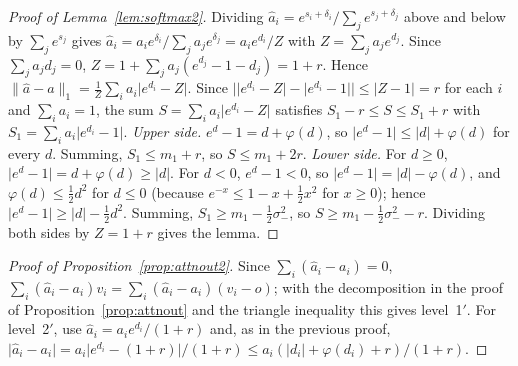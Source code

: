\documentclass[10pt]{article}
\theoremstyle{plain}
\theoremstyle{definition}
\theoremstyle{remark}
\begin{document}
\begin{proof}[Proof of Lemma~\ref{lem:softmax2}]
Dividing $\hat a_i=e^{s_i+\delta_i}/\sum_je^{s_j+\delta_j}$ above and below by $\sum_je^{s_j}$ gives $\hat a_i=a_ie^{\delta_i}/\sum_ja_je^{\delta_j}=a_ie^{d_i}/Z$ with $Z=\sum_ja_je^{d_j}$. Since $\sum_ja_jd_j=0$, $Z=1+\sum_ja_j(e^{d_j}-1-d_j)=1+r$. Hence $\lVert\hat a-a\rVert_1=\frac1Z\sum_ia_i\lvert e^{d_i}-Z\rvert$. Since $\bigl\lvert\lvert e^{d_i}-Z\rvert-\lvert e^{d_i}-1\rvert\bigr\rvert\le\lvert Z-1\rvert=r$ for each $i$ and $\sum_ia_i=1$, the sum $S=\sum_ia_i\lvert e^{d_i}-Z\rvert$ satisfies $S_1-r\le S\le S_1+r$ with $S_1=\sum_ia_i\lvert e^{d_i}-1\rvert$.
\emph{Upper side.} $e^d-1=d+\varphi(d)$, so $\lvert e^d-1\rvert\le\lvert d\rvert+\varphi(d)$ for every $d$. Summing, $S_1\le m_1+r$, so $S\le m_1+2r$.
\emph{Lower side.} For $d\ge0$, $\lvert e^d-1\rvert=d+\varphi(d)\ge\lvert d\rvert$. For $d<0$, $e^d-1<0$, so $\lvert e^d-1\rvert=\lvert d\rvert-\varphi(d)$, and $\varphi(d)\le\frac12d^2$ for $d\le0$ (because $e^{-x}\le1-x+\frac12x^2$ for $x\ge0$); hence $\lvert e^d-1\rvert\ge\lvert d\rvert-\frac12d^2$. Summing, $S_1\ge m_1-\frac12\sigma_-^2$, so $S\ge m_1-\frac12\sigma_-^2-r$.
Dividing both sides by $Z=1+r$ gives the lemma.
\end{proof}

\begin{proof}[Proof of Proposition~\ref{prop:attnout2}]
Since $\sum_i(\hat a_i-a_i)=0$, $\sum_i(\hat a_i-a_i)v_i=\sum_i(\hat a_i-a_i)(v_i-o)$; with the decomposition in the proof of Proposition~\ref{prop:attnout} and the triangle inequality this gives level~1$'$. For level~2$'$, use $\hat a_i=a_ie^{d_i}/(1+r)$ and, as in the previous proof, $\lvert\hat a_i-a_i\rvert=a_i\lvert e^{d_i}-(1+r)\rvert/(1+r)\le a_i(\lvert d_i\rvert+\varphi(d_i)+r)/(1+r)$.
\end{proof}
\end{document}
